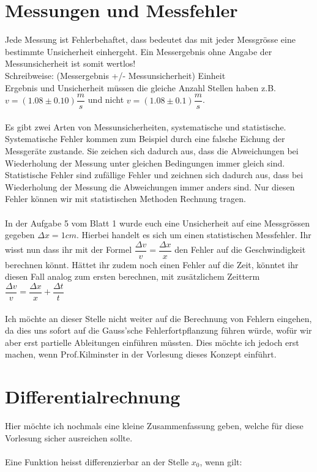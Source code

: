 \documentclass[12pt]{article}
\begin{document}
\section{Messungen und Messfehler}
Jede Messung ist Fehlerbehaftet, dass bedeutet das mit jeder Messgrösse eine bestimmte Unsicherheit einhergeht. Ein Messergebnis ohne Angabe der Messunsicherheit ist somit wertlos!\\
Schreibweise: (Messergebnis +/- Messunsicherheit) Einheit \\
Ergebnis und Unsicherheit müssen die gleiche Anzahl Stellen haben z.B. $v = (1.08 \pm 0.10) \dfrac{m}{s}$ und nicht $v=(1.08 \pm 0.1) \dfrac{m}{s}$.\\
\\Es gibt zwei Arten von Messunsicherheiten, systematische und statistische. Systematische Fehler kommen zum Beispiel durch eine falsche Eichung der Messgeräte zustande. Sie zeichen sich dadurch aus, dass die Abweichungen bei Wiederholung der Messung unter gleichen Bedingungen immer gleich sind. Statistische Fehler sind zufällige Fehler und zeichnen sich dadurch aus, dass bei Wiederholung der Messung die Abweichungen immer anders sind. Nur diesen Fehler können wir mit statistischen Methoden Rechnung tragen.\\
\\In der Aufgabe 5 vom Blatt 1 wurde euch eine Unsicherheit auf eine Messgrössen gegeben $\Delta x = 1cm$. Hierbei handelt es sich um einen statistischen Messfehler. Ihr wisst nun dass ihr mit der Formel $\dfrac{\Delta v}{v} = \dfrac{\Delta x}{x}$ den Fehler auf die Geschwindigkeit berechnen könnt. Hättet ihr zudem noch einen Fehler auf die Zeit, könntet ihr diesen Fall analog zum ersten berechnen, mit zusätzlichem Zeitterm $\dfrac{\Delta v}{v} = \dfrac{\Delta x}{x} + \dfrac{\Delta t}{t}$\\
\\ Ich möchte an dieser Stelle nicht weiter auf die Berechnung von Fehlern eingehen, da dies uns sofort auf die Gauss'sche Fehlerfortpflanzung führen würde, wofür wir aber erst partielle Ableitungen einführen müssten. Dies möchte ich jedoch erst machen, wenn Prof.Kilminster in der Vorlesung dieses Konzept einführt.


\section{Differentialrechnung}
Hier möchte ich nochmals eine kleine Zusammenfassung geben, welche für diese Vorlesung sicher ausreichen sollte.\\
\\
Eine Funktion heisst differenzierbar an der Stelle $x_0$, wenn gilt:
\end{document}

